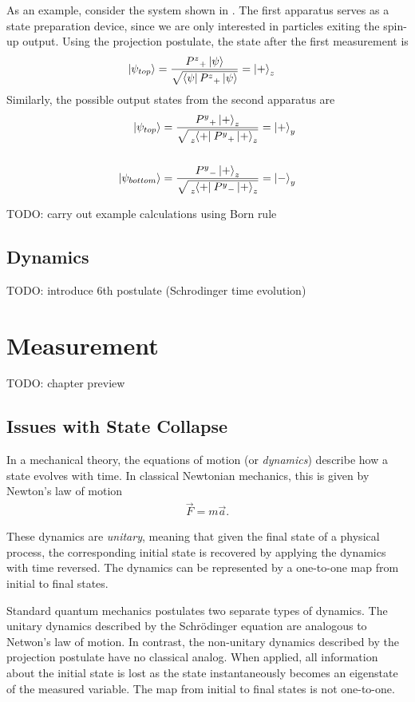 As an example, consider the system shown in . The first apparatus serves as a state preparation device, since we are only interested in particles exiting the spin-up output. Using the projection postulate, the state after the first measurement is
\begin{align}
    \ket{\psi_{top}} &= \frac{{P^z}_+\ket{\psi}}{\sqrt{\bra{\psi}{P^z}_+\ket{\psi}}} = \ket{+}_z
\end{align}
Similarly, the possible output states from the second apparatus are
\begin{align}
    \ket{\psi_{top}} &= \frac{{P^y}_+\ket{+}_z}{\sqrt{\tensor[_z]{\bra{+}}{}{P^y}_+\ket{+}_z}} = \ket{+}_y \\ \\
    \ket{\psi_{bottom}} &= \frac{{P^y}_-\ket{+}_z}{\sqrt{\tensor[_z]{\bra{+}}{}{P^y}_-\ket{+}_z}} = \ket{-}_y
\end{align}

TODO: carry out example calculations using Born rule

\section{Dynamics}
TODO: introduce 6th postulate (Schrodinger time evolution)

\chapter{Measurement}

TODO: chapter preview

\section{Issues with State Collapse}
In a mechanical theory, the equations of motion (or \textit{dynamics}) describe how a state evolves with time. In classical Newtonian mechanics, this is given by Newton's law of motion
\begin{align}
  \vec{F} = m\vec{a}.
\end{align}

These dynamics are \textit{unitary}, meaning that given the final state of a physical process, the corresponding initial state is recovered by applying the dynamics with time reversed. The dynamics can be represented by a one-to-one map from initial to final states.

Standard quantum mechanics postulates two separate types of dynamics. The unitary dynamics described by the Schrödinger equation are analogous to Netwon's law of motion. In contrast, the non-unitary dynamics described by the projection postulate have no classical analog. When applied, all information about the initial state is lost as the state instantaneously becomes an eigenstate of the measured variable. The map from initial to final states is not one-to-one.

